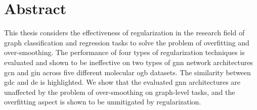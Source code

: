 %
\chapter*{Abstract}
\label{sec:abstract}
\vspace*{-10mm}

This thesis considers the effectiveness of regularization in the research field of graph classification and regression tasks to solve the problem of overfitting and over-smoothing. %
The performance of four types of regularization techniques is evaluated and shown to be ineffective on two types of \ac{gnn} network architectures \ac{gcn} and \ac{gin} across five different molecular \ac{ogb} datasets. The similarity between \ac{gdc} and \ac{de} is highlighted.
We show that the evaluated \ac{gnn} architectures are unaffected by the problem of over-smoothing on graph-level tasks, and the overfitting aspect is shown to be unmitigated by regularization.



